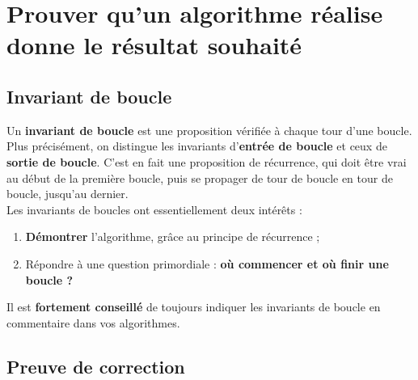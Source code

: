 \section{Prouver qu'un algorithme réalise donne le résultat souhaité}

\subsection{Invariant de boucle}

\begin{defi}
Un \textbf{invariant de boucle} est une proposition vérifiée à chaque tour d'une boucle. Plus 
précisément, on distingue les invariants d'\textbf{entrée de boucle} et ceux de \textbf{sortie de 
boucle}. C'est en fait une proposition de récurrence, qui doit être vrai au début de la première 
boucle, puis se propager de tour de boucle en tour de boucle, jusqu'au dernier.\\
Les invariants de boucles ont essentiellement deux intérêts :
\begin{enumerate}
 \item \textbf{Démontrer} l'algorithme, grâce au principe de récurrence ;
 \item Répondre à une question primordiale : \textbf{où commencer et où finir une boucle ?}
\end{enumerate}
\end{defi}

\begin{rem}
Il est \textbf{fortement conseillé} de toujours indiquer les invariants de boucle en commentaire 
dans vos algorithmes.\\ 
\end{rem}



\subsection{Preuve de correction}

